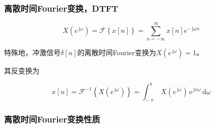 \documentclass[UTF8,fontset=fandol,zihao=5]{ctexart}
\newcommand{\jj}{\,\mathrm{j}}
\newcommand{\ee}{\,\mathrm{e}}
\newcommand{\dd}{\,\mathrm{d}}
\newcommand{\FF}{\mathcal{F}}
\begin{document}
\subsubsection{离散时间Fourier变换，DTFT}

\[
X(e^{\jj\omega}) = \FF \left\{ x[n] \right\} = \sum_{n=-\infty}^{\infty} x[n] e^{-\jj\omega n}
\]

特殊地，冲激信号$\delta[n]$的离散时间Fourier变换为$X(e^{\jj\omega})=1$。

其反变换为

\[
x[n] = \FF^{-1} \left\{ X(e^{\jj\omega}) \right\} = \int_{-\uppi}^{\uppi} X(e^{\jj\omega}) \ee^{\jj n\omega}\dd\omega
\]

\subsubsection{离散时间Fourier变换性质}
\end{document}

